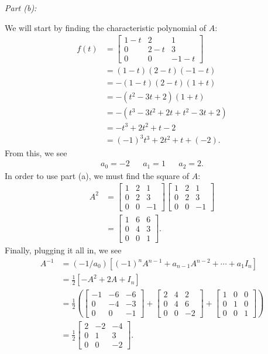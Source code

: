 \documentclass[10pt,a4paper]{article}
\makeatletter
\newcommand{\proofpart}[2]{%
  \par
  \addvspace{\medskipamount}%
  \noindent\emph{Part #1: #2}\par\nobreak
  \addvspace{\smallskipamount}%
  \@afterheading
}
\theoremstyle{definition}
\makeatother
\begin{document}
\proofpart{(b)}{} We will start by finding the characteristic polynomial of $A$:
\begin{align*}
f(t) &= \begin{bmatrix}
1 - t & 2 & 1\\
0 & 2 - t & 3\\
0 & 0 & -1 - t
\end{bmatrix}\\
&= (1-t)(2-t)(-1 - t)\\
&= -(1-t)(2-t)(1 + t)\\
&= -(t^2 - 3t + 2)(1 + t)\\
&= -(t^3 - 3t^2 + 2t + t^2 - 3t + 2)\\
&= -t^3 + 2t^2 + t - 2\\
&= (-1)^3 t^3 + 2t^2 + t + (-2).
\end{align*}
From this, we see
\begin{align*}
a_0 = -2 && a_1 = 1 && a_2 = 2.
\end{align*}
In order to use part (a), we must find the square of $A$:
\begin{align*}
A^2 &= \begin{bmatrix}
1 & 2 & 1\\
0 & 2 & 3\\
0 & 0 & -1
\end{bmatrix} \begin{bmatrix}
1 & 2 & 1\\
0 & 2 & 3\\
0 & 0 & -1
\end{bmatrix}\\
&= \begin{bmatrix}
1 & 6 & 6\\
0 & 4 & 3\\
0 & 0 & 1
\end{bmatrix}.
\end{align*}
Finally, plugging it all in, we see
\begin{align*}
A^{-1} &= (-1/a_0) [(-1)^n A^{n-1} + a_{n-1} A^{n-2} + \cdots + a_1 I_n]\\
&= \frac{1}{2}[-A^2 + 2A + I_n]\\
&= \frac{1}{2} \left( \begin{bmatrix}
-1 & -6 & -6\\
0 & -4 & -3\\
0 & 0 & -1
\end{bmatrix} + \begin{bmatrix}
2 & 4 & 2\\
0 & 4 & 6\\
0 & 0 & -2
\end{bmatrix} + \begin{bmatrix}
1 & 0 & 0\\
0 & 1 & 0\\
0 & 0 & 1
\end{bmatrix}\right)\\
&= \frac{1}{2} \begin{bmatrix}
2 & -2 & -4\\
0 & 1 & 3\\
0 & 0 & -2
\end{bmatrix}.
\end{align*}
\end{document}

